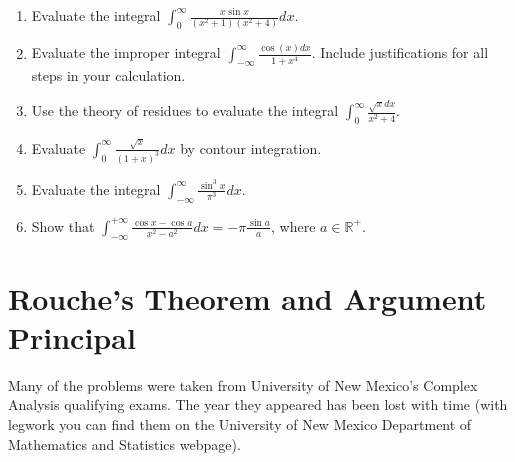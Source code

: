 \documentclass[a4paper,10pt]{article}
\begin{document}
\begin{enumerate}
	
	\item Evaluate the integral $\int_{0}^{\infty}\frac{x \sin x}{(x^{2}+1)(x^{2}+4)}dx$.
	
	\item Evaluate the improper integral $\int_{-\infty}^{\infty}\frac{\cos(x)dx}{1+x^{4}}$. Include justifications for all steps in your calculation.
	
	\item Use the theory of residues to evaluate the integral $\int_{0}^{\infty}\frac{\sqrt{x}dx}{x^{2}+4}$.

	\item Evaluate $\int_{0}^{\infty}\frac{\sqrt{x}}{(1+x)^{3}}dx$ by contour integration.
	
	\item Evaluate the integral $\int_{-\infty}^{\infty}\frac{\sin^{3}x}{\pi^{3}}dx$.
	

	
	\item Show that $\int_{-\infty}^{+\infty}\frac{\cos x - \cos a}{x^{2}-a^{2}}dx = -\pi\frac{\sin a}{a}$, where $a \in \mathbb{R}^{+}$.
	
\end{enumerate}

\newpage
\section{Rouche's Theorem and Argument Principal}

Many of the problems were taken from University of New Mexico's Complex Analysis qualifying exams. The year they appeared has been lost with time (with legwork you can find them on the University of New Mexico Department of Mathematics and Statistics webpage).
\end{document}

